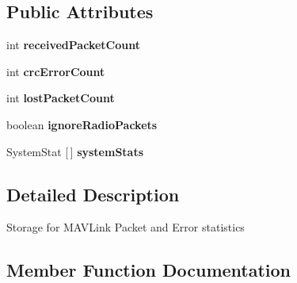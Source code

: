 \subsection*{Public Attributes}
\begin{DoxyCompactItemize}
\item 
\mbox{\label{classcom_1_1MAVLink_1_1Messages_1_1MAVLinkStats_a019b6f44a6f08c0ed84d197ca08942a1}} 
int {\bfseries received\+Packet\+Count}
\item 
\mbox{\label{classcom_1_1MAVLink_1_1Messages_1_1MAVLinkStats_ad1252f1b83af0035d0db52d2315c76c8}} 
int {\bfseries crc\+Error\+Count}
\item 
\mbox{\label{classcom_1_1MAVLink_1_1Messages_1_1MAVLinkStats_a56bfffd01dd23f6a21b923eb3a1b8060}} 
int {\bfseries lost\+Packet\+Count}
\item 
\mbox{\label{classcom_1_1MAVLink_1_1Messages_1_1MAVLinkStats_a1dde02cba4a77df273af88534f38e29a}} 
boolean {\bfseries ignore\+Radio\+Packets}
\item 
\mbox{\label{classcom_1_1MAVLink_1_1Messages_1_1MAVLinkStats_af5f6d4b3c54f7c68b928c3bfd3286452}} 
System\+Stat \mbox{[}$\,$\mbox{]} {\bfseries system\+Stats}
\end{DoxyCompactItemize}


\subsection{Detailed Description}
Storage for M\+A\+V\+Link Packet and Error statistics 

\subsection{Member Function Documentation}
\mbox{\label{classcom_1_1MAVLink_1_1Messages_1_1MAVLinkStats_a15deaa3b7c3753cc5a4cd11332f05182}} 
